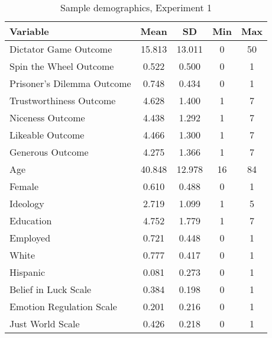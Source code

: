 \renewcommand{\baselinestretch}{1.25}%
\begin{table}[H]
\centering

\begin{threeparttable}
\caption{Sample demographics, Experiment 1}

\begin{tabular}[t]{lcccc}
\toprule
Variable & Mean & SD & Min & Max\\
\midrule
Dictator Game Outcome & 15.813 & 13.011 & 0 & 50\\
Spin the Wheel Outcome & 0.522 & 0.500 & 0 & 1\\
Prisoner's Dilemma Outcome & 0.748 & 0.434 & 0 & 1\\
Trustworthiness Outcome & 4.628 & 1.400 & 1 & 7\\
Niceness Outcome & 4.438 & 1.292 & 1 & 7\\
Likeable Outcome & 4.466 & 1.300 & 1 & 7\\
Generous Outcome & 4.275 & 1.366 & 1 & 7\\
Age & 40.848 & 12.978 & 16 & 84\\
Female & 0.610 & 0.488 & 0 & 1\\
Ideology & 2.719 & 1.099 & 1 & 5\\
Education & 4.752 & 1.779 & 1 & 7\\
Employed & 0.721 & 0.448 & 0 & 1\\
White & 0.777 & 0.417 & 0 & 1\\
Hispanic & 0.081 & 0.273 & 0 & 1\\
Belief in Luck Scale & 0.384 & 0.198 & 0 & 1\\
Emotion Regulation Scale & 0.201 & 0.216 & 0 & 1\\
Just World Scale & 0.426 & 0.218 & 0 & 1\\
\bottomrule
\end{tabular}
\label{tab:exp1_sample}
\begin{tablenotes}[flushleft]
\scriptsize
\item[\hspace{-5mm}] 
\end{tablenotes}
\end{threeparttable}
\end{table}
\renewcommand{\baselinestretch}{1.67}%
